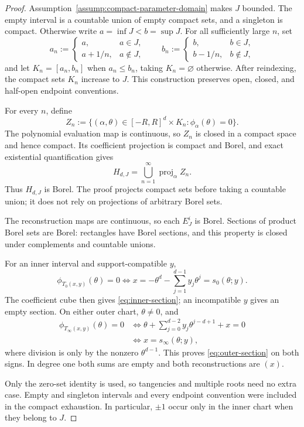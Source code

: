 \begin{proof}
Assumption~\ref{assump:compact-parameter-domain} makes $J$ bounded.  The
empty interval is a countable union of empty compact sets, and a singleton is
compact.  Otherwise write $a=\inf J<b=\sup J$.  For all sufficiently large
$n$, set
\[
a_n:=\begin{cases}a,&a\in J,\\a+1/n,&a\notin J,\end{cases}
\qquad
b_n:=\begin{cases}b,&b\in J,\\b-1/n,&b\notin J,\end{cases}
\]
and let $K_n=[a_n,b_n]$ when $a_n\leq b_n$, taking $K_n=\varnothing$
otherwise.  After reindexing, the compact sets $K_n$ increase to $J$.  This
construction preserves open, closed, and half-open endpoint conventions.

For every $n$, define
\[
Z_n:=\{(\alpha,\theta)\in[-R,R]^d\times K_n:
\phi_\alpha(\theta)=0\}.
\]
The polynomial evaluation map is continuous, so $Z_n$ is closed in a compact
space and hence compact.  Its coefficient projection is compact and Borel,
and exact existential quantification gives
\[
H_{d,J}=\bigcup_{n=1}^\infty\operatorname{proj}_\alpha Z_n.
\]
Thus $H_{d,J}$ is Borel.  The proof projects compact sets before taking a
countable union; it does not rely on projections of arbitrary Borel sets.

The reconstruction maps are continuous, so each $E^i_J$ is Borel.  Sections
of product Borel sets are Borel: rectangles have Borel sections, and this
property is closed under complements and countable unions.

For an inner interval and support-compatible $y$,
\[
\phi_{T_0(x,y)}(\theta)=0
\Longleftrightarrow
x=-\theta^d-\sum_{j=1}^{d-1}y_j\theta^j=s_0(\theta;y).
\]
The coefficient cube then gives \eqref{eq:inner-section}; an incompatible
$y$ gives an empty section.  On either outer chart, $\theta\neq0$, and
\[
\begin{aligned}
\phi_{T_\infty(x,y)}(\theta)=0
&\Longleftrightarrow
\theta+\sum_{j=0}^{d-2}y_j\theta^{j-d+1}+x=0\\
&\Longleftrightarrow x=s_\infty(\theta;y),
\end{aligned}
\]
where division is only by the nonzero $\theta^{d-1}$.  This proves
\eqref{eq:outer-section} on both signs.  In degree one both sums are empty
and both reconstructions are $(x)$.

Only the zero-set identity is used, so tangencies and multiple roots need no
extra case.  Empty and singleton intervals and every endpoint convention
were included in the compact exhaustion.  In particular, $\pm1$ occur only
in the inner chart when they belong to $J$.
\end{proof}

